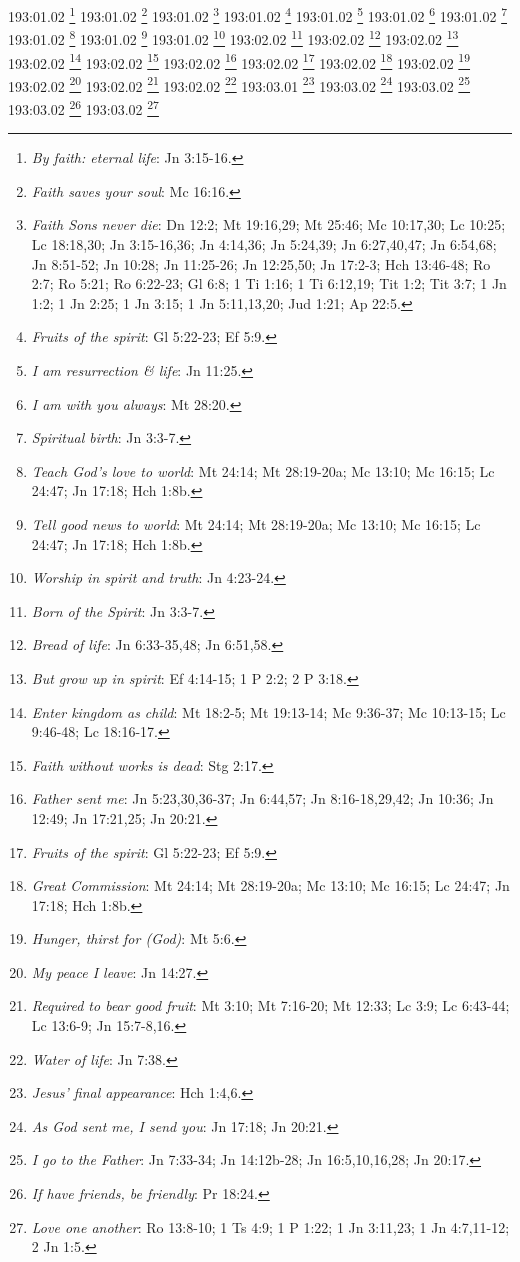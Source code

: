 193:01.02 \footnote{\textit{By faith: eternal life}: Jn 3:15-16.}
193:01.02 \footnote{\textit{Faith saves your soul}: Mc 16:16.}
193:01.02 \footnote{\textit{Faith Sons never die}: Dn 12:2; Mt 19:16,29; Mt 25:46; Mc 10:17,30; Lc 10:25; Lc 18:18,30; Jn 3:15-16,36; Jn 4:14,36; Jn 5:24,39; Jn 6:27,40,47; Jn 6:54,68; Jn 8:51-52; Jn 10:28; Jn 11:25-26; Jn 12:25,50; Jn 17:2-3; Hch 13:46-48; Ro 2:7; Ro 5:21; Ro 6:22-23; Gl 6:8; 1 Ti 1:16; 1 Ti 6:12,19; Tit 1:2; Tit 3:7; 1 Jn 1:2; 1 Jn 2:25; 1 Jn 3:15; 1 Jn 5:11,13,20; Jud 1:21; Ap 22:5.}
193:01.02 \footnote{\textit{Fruits of the spirit}: Gl 5:22-23; Ef 5:9.}
193:01.02 \footnote{\textit{I am resurrection & life}: Jn 11:25.}
193:01.02 \footnote{\textit{I am with you always}: Mt 28:20.}
193:01.02 \footnote{\textit{Spiritual birth}: Jn 3:3-7.}
193:01.02 \footnote{\textit{Teach God's love to world}: Mt 24:14; Mt 28:19-20a; Mc 13:10; Mc 16:15; Lc 24:47; Jn 17:18; Hch 1:8b.}
193:01.02 \footnote{\textit{Tell good news to world}: Mt 24:14; Mt 28:19-20a; Mc 13:10; Mc 16:15; Lc 24:47; Jn 17:18; Hch 1:8b.}
193:01.02 \footnote{\textit{Worship in spirit and truth}: Jn 4:23-24.}
193:02.02 \footnote{\textit{Born of the Spirit}: Jn 3:3-7.}
193:02.02 \footnote{\textit{Bread of life}: Jn 6:33-35,48; Jn 6:51,58.}
193:02.02 \footnote{\textit{But grow up in spirit}: Ef 4:14-15; 1 P 2:2; 2 P 3:18.}
193:02.02 \footnote{\textit{Enter kingdom as child}: Mt 18:2-5; Mt 19:13-14; Mc 9:36-37; Mc 10:13-15; Lc 9:46-48; Lc 18:16-17.}
193:02.02 \footnote{\textit{Faith without works is dead}: Stg 2:17.}
193:02.02 \footnote{\textit{Father sent me}: Jn 5:23,30,36-37; Jn 6:44,57; Jn 8:16-18,29,42; Jn 10:36; Jn 12:49; Jn 17:21,25; Jn 20:21.}
193:02.02 \footnote{\textit{Fruits of the spirit}: Gl 5:22-23; Ef 5:9.}
193:02.02 \footnote{\textit{Great Commission}: Mt 24:14; Mt 28:19-20a; Mc 13:10; Mc 16:15; Lc 24:47; Jn 17:18; Hch 1:8b.}
193:02.02 \footnote{\textit{Hunger, thirst for (God)}: Mt 5:6.}
193:02.02 \footnote{\textit{My peace I leave}: Jn 14:27.}
193:02.02 \footnote{\textit{Required to bear good fruit}: Mt 3:10; Mt 7:16-20; Mt 12:33; Lc 3:9; Lc 6:43-44; Lc 13:6-9; Jn 15:7-8,16.}
193:02.02 \footnote{\textit{Water of life}: Jn 7:38.}
193:03.01 \footnote{\textit{Jesus' final appearance}: Hch 1:4,6.}
193:03.02 \footnote{\textit{As God sent me, I send you}: Jn 17:18; Jn 20:21.}
193:03.02 \footnote{\textit{I go to the Father}: Jn 7:33-34; Jn 14:12b-28; Jn 16:5,10,16,28; Jn 20:17.}
193:03.02 \footnote{\textit{If have friends, be friendly}: Pr 18:24.}
193:03.02 \footnote{\textit{Love one another}: Ro 13:8-10; 1 Ts 4:9; 1 P 1:22; 1 Jn 3:11,23; 1 Jn 4:7,11-12; 2 Jn 1:5.}
